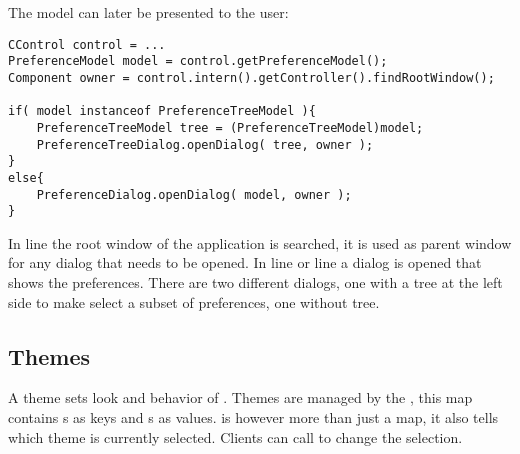 The model can later be presented to the user:
\begin{lstlisting}
CControl control = ...
PreferenceModel model = control.getPreferenceModel();
Component owner = control.intern().getController().findRootWindow();

if( model instanceof PreferenceTreeModel ){
	PreferenceTreeModel tree = (PreferenceTreeModel)model;
	PreferenceTreeDialog.openDialog( tree, owner );
}
else{
	PreferenceDialog.openDialog( model, owner );
}
\end{lstlisting}
In line  the root window of the application is searched, it is used as parent window for any dialog that needs to be opened. In line  or line  a dialog is opened that shows the preferences. There are two different dialogs, one with a tree at the left side to make select a subset of preferences, one without tree.



\subsection{Themes} \label{sec:theme}
A theme sets look and behavior of . Themes are managed by the , this map contains s as keys and s as values.  is however more than just a map, it also tells which theme is currently selected. Clients can call  to change the selection.

